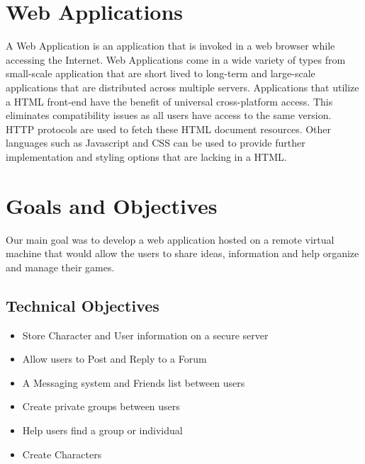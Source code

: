 \section{Web Applications}
A Web Application is an application that is invoked in a web browser while accessing the Internet. Web Applications come in a wide variety of types from small-scale application that are short lived to long-term and large-scale applications that are distributed across multiple servers. Applications that utilize a HTML front-end have the benefit of universal cross-platform access. This eliminates compatibility issues as all users have access to the same version. \cite{hadley2006web} HTTP protocols are used to fetch these HTML document resources. Other languages such as Javascript and CSS can be used to provide further implementation and styling options that are lacking in a HTML.

\section{Goals and Objectives}
Our main goal was to develop a web application hosted on a remote virtual machine that would allow the users to share ideas, information and help organize and manage their games.

\subsection{Technical Objectives}
\begin{itemize}
    \item Store Character and User information on a secure server
    \item Allow users to Post and Reply to a Forum
    \item A Messaging system and Friends list between users
    \item Create private groups between users
    \item Help users find a group or individual
    \item Create Characters
\end{itemize}

